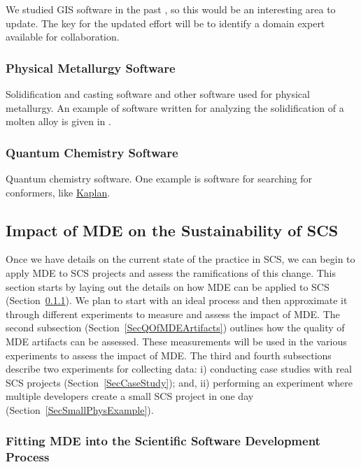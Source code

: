 \documentclass[12pt]{article}
\begin{document}
We studied GIS software in the past \citep{SmithEtAl2018_arXivGIS}, so this
would be an interesting area to update.  The key for the updated effort will be
to identify a domain expert available for collaboration. %

\subsubsection{Physical Metallurgy Software}

Solidification and casting software and other software used for physical
metallurgy.  An example of software written for analyzing the solidification of
a molten alloy is given in \citet{SmithEtAl2019_arXiv}.  %

\subsubsection{Quantum Chemistry Software}

Quantum chemistry software.  One example is software for searching for
conformers, like
\href{https://github.com/PeaWagon/Kaplan}{Kaplan}.  %

\subsection{Impact of MDE on the Sustainability of SCS} \label{SecImpactMDE}

Once we have details on the current state of the practice in SCS, we can begin
to apply MDE to SCS projects and assess the ramifications of this change.  This
section starts by laying out the details on how MDE can be applied to SCS
(Section~\ref{SecMDEProcess}).  We plan to start with an ideal process and then
approximate it through different experiments to measure and assess the impact of
MDE.  The second subsection (Section~\ref{SecQOfMDEArtifacts}) outlines how the
quality of MDE artifacts can be assessed.  These measurements will be used in
the various experiments to assess the impact of MDE.  The third and fourth
subsections describe two experiments for collecting data: i) conducting case
studies with real SCS projects (Section~\ref{SecCaseStudy}); and, ii) performing
an experiment where multiple developers create a small SCS project in one day
(Section~\ref{SecSmallPhysExample}).

\subsubsection{Fitting MDE into the Scientific Software Development
  Process} \label{SecMDEProcess}
\end{document}
